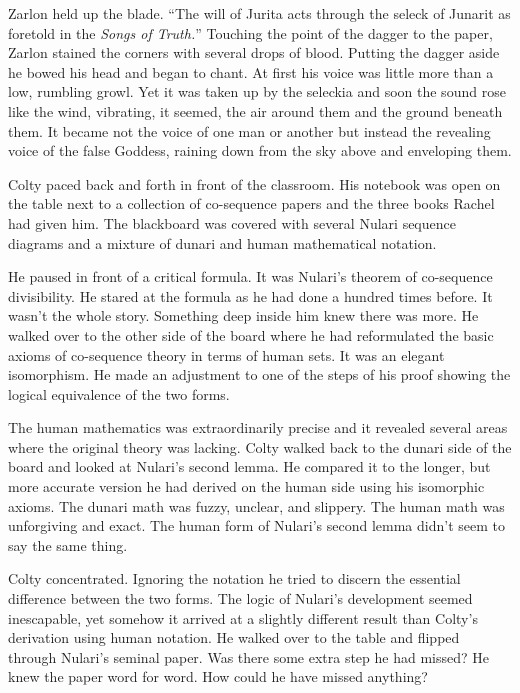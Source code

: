 Zarlon held up the blade. ``The will of Jurita acts through the seleck of Junarit as foretold in
the \textit{Songs of Truth.}'' Touching the point of the dagger to the paper, Zarlon stained the
corners with several drops of blood. Putting the dagger aside he bowed his head and began to
chant. At first his voice was little more than a low, rumbling growl. Yet it was taken up by the
seleckia and soon the sound rose like the wind, vibrating, it seemed, the air around them and
the ground beneath them. It became not the voice of one man or another but instead the revealing
voice of the false Goddess, raining down from the sky above and enveloping them.

\spacebreak

Colty paced back and forth in front of the classroom. His notebook was open on the table next to
a collection of co-sequence papers and the three books Rachel had given him. The blackboard was
covered with several Nulari sequence diagrams and a mixture of dunari and human mathematical
notation.

He paused in front of a critical formula. It was Nulari's theorem of co-sequence divisibility.
He stared at the formula as he had done a hundred times before. It wasn't the whole story.
Something deep inside him knew there was more. He walked over to the other side of the board
where he had reformulated the basic axioms of co-sequence theory in terms of human sets. It was
an elegant isomorphism. He made an adjustment to one of the steps of his proof showing the
logical equivalence of the two forms.

The human mathematics was extraordinarily precise and it revealed several areas where the
original theory was lacking. Colty walked back to the dunari side of the board and looked at
Nulari's second lemma. He compared it to the longer, but more accurate version he had derived on
the human side using his isomorphic axioms. The dunari math was fuzzy, unclear, and slippery.
The human math was unforgiving and exact. The human form of Nulari's second lemma didn't seem to
say the same thing.


Colty concentrated. Ignoring the notation he tried to discern the essential difference between
the two forms. The logic of Nulari's development seemed inescapable, yet somehow it arrived at a
slightly different result than Colty's derivation using human notation. He walked over to the
table and flipped through Nulari's seminal paper. Was there some extra step he had missed? He
knew the paper word for word. How could he have missed anything?


